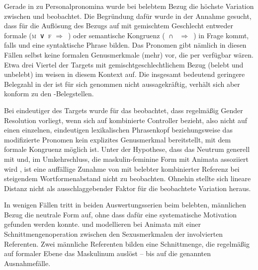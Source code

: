 Gerade in  zu Personalpronomina wurde
bei belebtem Bezug die höchste Variation zwischen  und
 beobachtet. Die Begründung dafür wurde in der Annahme gesucht,
dass für die Auflösung des Bezugs auf 
mit gemischtem Geschlecht entweder formale
(\textsc{m}~∨~\textsc{f} $\Rightarrow$~) oder semantische
Kongruenz (\SM{}~∩~\SF{} $\Rightarrow$~) in
Frage kommt, falls  und  eine syntaktische Phrase bilden.
Das Pronomen gibt nämlich in diesen Fällen selbst keine formalen
Genus\-merk\-male (mehr) vor, die per  verfügbar wären. Etwa drei
Viertel der Targets mit gemischtgeschlechtlichem Bezug
(belebt und unbelebt) im \CAO{} weisen in diesem
Kontext  auf. Die insgesamt bedeutend geringere
Belegzahl in der \KC{} ist für sich genommen nicht aussagekräftig, verhält sich
aber konform zu den \CAO-Belegstellen.

Bei eindeutiger  des Targets wurde für das
\CAO{} beobachtet, dass regel\-mäßig Gender Re\-solu\-tion vorliegt, wenn sich
 auf kombinierte Controller bezieht, also nicht auf einen
einzelnen, eindeutigen lexikalischen Phrasenkopf beziehungsweise das
modifizierte Pronomen kein explizites Genusmerkmal bereitstellt, mit dem
formale Kongruenz möglich ist. Unter der Hypothese, dass
das Neutrum generell mit  und, im Umkehrschluss, die
maskulin-feminine Form mit Animata assoziiert wird
\autocite[243--245]{askedal1973}, ist eine auffällige Zunahme von 
mit belebter kombinierter Referenz bei steigendem
Wortformenabstand nicht zu beobachten. Ohnehin stellte sich
lineare Distanz nicht als ausschlaggebender Faktor für die beob\-ach\-tete
Variation heraus.

In wenigen Fällen tritt in beiden Auswertungs\-serien beim belebten, männlichen
Bezug die neutrale Form auf, ohne dass dafür eine systematische Motivation
gefunden werden konnte. \citet{wechslerzlatic2003} und \citet{wechsler2009}
modellieren  bei Animata mit einer
Schnittmengenoperation zwischen den Sexusmerkmalen der
involvierten Referenten. Zwei männliche Referenten bilden eine Schnittmenge,
die regelmäßig auf formaler Ebene das Maskulinum auslöst -- bis auf die
genannten Ausnahmefälle.

